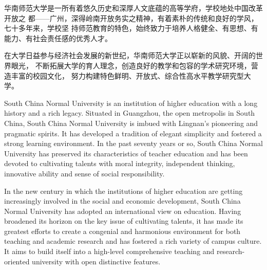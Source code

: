 \begin{cabstract}
华南师范大学是一所有着悠久历史和深厚人文底蕴的高等学府，学校地处中国改革开放之%
都——广州，深得岭南开放务实之精神，有着素朴的传统和良好的学风，七十多年来，学校坚%
持师范教育的特色，始终致力于培养人格健全、有思想、有能力、有社会责任感的优秀人才。%

在大学日益参与经济社会发展的新世纪，华南师范大学正以崭新的风貌、开阔的世界眼光，%
不断拓展大学的育人理念，创造良好的教学和包容的学术研究环境，营造丰富的校园文化，%
努力构建特色鲜明、开放式、综合性高水平教学研究型大学。%
\end{cabstract}

\begin{eabstract}
  South China Normal University is an institution of higher education with a
  long history and a rich legacy. Situated in Guangzhou, the open metropolis in
  South China, South China Normal University is imbued with Lingnan's
  pioneering and pragmatic spirits. It has developed a tradition of elegant
  simplicity and fostered a strong learning environment. In the past seventy
  years or so, South China Normal University has preserved its characteristics
  of teacher education and has been devoted to cultivating talents with moral
  integrity, independent thinking, innovative ability and sense of social
  responsibility.

  In the new century in which the institutions of higher education are getting
  increasingly involved in the social and economic development, South China
  Normal University has adopted an international view on education. Having
  broadened its horizon on the key issue of cultivating talents, it has made its
  greatest efforts to create a congenial and harmonious environment for both
  teaching and academic research and has fostered a rich variety of campus
  culture. It aims to build itself into a high-level comprehensive teaching and
  research-oriented university with open distinctive features.
\end{eabstract}

